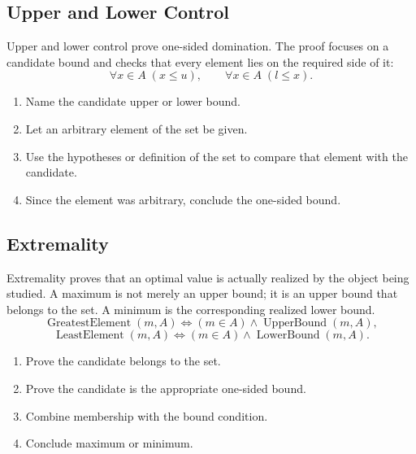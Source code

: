 \subsection*{Upper and Lower Control}
\label{subsec:property-upper-lower-control}

Upper and lower control prove one-sided domination. The proof focuses on a
candidate bound and checks that every element lies on the required side of it:
\[
  \forall x\in A\;(x\leq u),
  \qquad
  \forall x\in A\;(l\leq x).
\]

\begin{remark}
\begin{enumerate}
  \item Name the candidate upper or lower bound.
  \item Let an arbitrary element of the set be given.
  \item Use the hypotheses or definition of the set to compare that element
        with the candidate.
  \item Since the element was arbitrary, conclude the one-sided bound.
\end{enumerate}
\end{remark}

\subsection*{Extremality}
\label{subsec:property-extremality}

Extremality proves that an optimal value is actually realized by the object
being studied. A maximum is not merely an upper bound; it is an upper bound
that belongs to the set. A minimum is the corresponding realized lower bound.
\[
  \operatorname{GreatestElement}(m,A)
  \Longleftrightarrow
  (m\in A)\land \operatorname{UpperBound}(m,A),
\]
\[
  \operatorname{LeastElement}(m,A)
  \Longleftrightarrow
  (m\in A)\land \operatorname{LowerBound}(m,A).
\]

\begin{remark}
\begin{enumerate}
  \item Prove the candidate belongs to the set.
  \item Prove the candidate is the appropriate one-sided bound.
  \item Combine membership with the bound condition.
  \item Conclude maximum or minimum.
\end{enumerate}
\end{remark}

